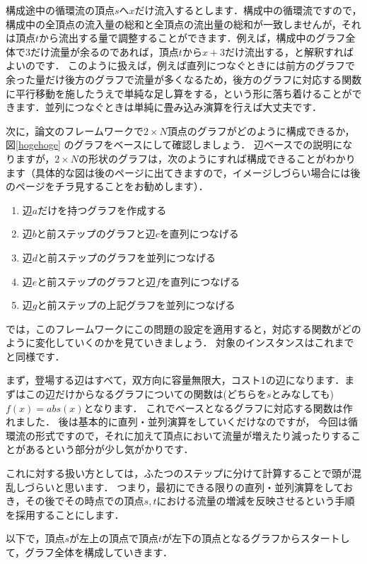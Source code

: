 \documentclass[13pt]{jarticle}
\begin{document}
構成途中の循環流の頂点$s$へ$x$だけ流入するとします．構成中の循環流ですので，構成中の全頂点の流入量の総和と全頂点の流出量の総和が一致しませんが，それは頂点$t$から流出する量で調整することができます．例えば，構成中のグラフ全体で3だけ流量が余るのであれば，頂点$t$から$x+3$だけ流出する，と解釈すればよいのです．
このように扱えば，例えば直列につなぐときには前方のグラフで余った量だけ後方のグラフで流量が多くなるため，後方のグラフに対応する関数に平行移動を施したうえで単純な足し算をする，という形に落ち着けることができます．並列につなぐときは単純に畳み込み演算を行えば大丈夫です．


次に，論文のフレームワークで$2 \times N$頂点のグラフがどのように構成できるか， 図\ref{hogehoge} のグラフをベースにして確認しましょう．
辺ベースでの説明になりますが，$2 \times N$の形状のグラフは，次のようにすれば構成できることがわかります（具体的な図は後のページに出てきますので，イメージしづらい場合には後のページをチラ見することをお勧めします）．

\begin{enumerate}
\item 辺$a$だけを持つグラフを作成する
\item 辺$b$と前ステップのグラフと辺$c$を直列につなげる
\item 辺$d$と前ステップのグラフを並列につなげる
\item 辺$e$と前ステップのグラフと辺$f$を直列につなげる
\item 辺$g$と前ステップの上記グラフを並列につなげる
\end{enumerate}

では，このフレームワークにこの問題の設定を適用すると，対応する関数がどのように変化していくのかを見ていきましょう．
対象のインスタンスはこれまでと同様です．


まず，登場する辺はすべて，双方向に容量無限大，コスト1の辺になります．まずはこの辺だけからなるグラフについての関数は(どちらを$s$とみなしても)$ f(x) = abs(x) $となります．
これでベースとなるグラフに対応する関数は作れました．
後は基本的に直列・並列演算をしていくだけなのですが，
今回は循環流の形式ですので，それに加えて頂点において流量が増えたり減ったりすることがあるという部分が少し気がかりです．

これに対する扱い方としては，ふたつのステップに分けて計算することで頭が混乱しづらいと思います．
つまり，最初にできる限りの直列・並列演算をしておき，その後でその時点での頂点$s,t$における流量の増減を反映させるという手順を採用することにします．

以下で，頂点$s$が左上の頂点で頂点$t$が左下の頂点となるグラフからスタートして，グラフ全体を構成していきます．
\end{document}
